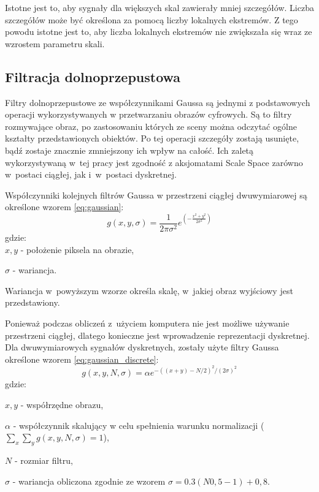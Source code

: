 Istotne jest to, aby sygnały dla większych skal zawierały mniej szczegółów. Liczba szczegółów może być określona za pomocą liczby lokalnych ekstremów. Z tego powodu istotne jest to, aby liczba lokalnych ekstremów nie zwiększała się wraz ze wzrostem parametru skali.

\subsection{Filtracja dolnoprzepustowa}
\label{subsec:filtracjaGaussa}
Filtry dolnoprzepustowe ze współczynnikami Gaussa są jednymi z podstawowych operacji wykorzystywanych w przetwarzaniu obrazów cyfrowych. Są to filtry rozmywające obraz, po zastosowaniu których ze sceny można odczytać ogólne kształty przedstawionych obiektów. Po tej operacji szczegóły zostają usunięte, bądź zostaje znacznie zmniejszony ich wpływ na całość. Ich zaletą wykorzystywaną w~tej pracy jest zgodność z aksjomatami Scale Space zarówno w~postaci ciągłej, jak i~w~postaci dyskretnej.

Współczynniki kolejnych filtrów Gaussa w przestrzeni ciągłej dwuwymiarowej są określone wzorem \eqref{eq:gaussian}:
\begin{equation}
\label{eq:gaussian}
g(x,y,\sigma)=\frac{1}{2  \pi  \sigma^ {2} } e^{(-\frac{x^{2} + y^{2}}{2  \sigma ^{2}})}
\end{equation}
gdzie:\\

$ x,y $ - położenie piksela na obrazie,

$ \sigma $ - wariancja.

Wariancja w~powyższym wzorze określa skalę, w~jakiej obraz wyjściowy jest przedstawiony. 

Ponieważ podczas obliczeń z~użyciem komputera nie jest możliwe używanie przestrzeni ciągłej, dlatego konieczne jest wprowadzenie reprezentacji dyskretnej. 
Dla dwuwymiarowych sygnałów dyskretnych, zostały użyte filtry Gaussa określone wzorem \eqref{eq:gaussian_discrete}:
\begin{equation}
\label{eq:gaussian_discrete}
g(x,y,N,\sigma) = \alpha  e^{-((x+y)-N/2)^2/(2  \sigma)^2}
\end{equation}
gdzie:

$ x, y$ - współrzędne obrazu,

$ \alpha $ - współczynnik skalujący w celu spełnienia warunku normalizacji ($ \sum_x \sum_y g(x,y,N,\sigma) = 1 $),

$ N $ - rozmiar filtru,

$ \sigma $ - wariancja obliczona zgodnie ze wzorem $ \sigma = 0.3  (N  0,5 - 1) + 0,8$.

